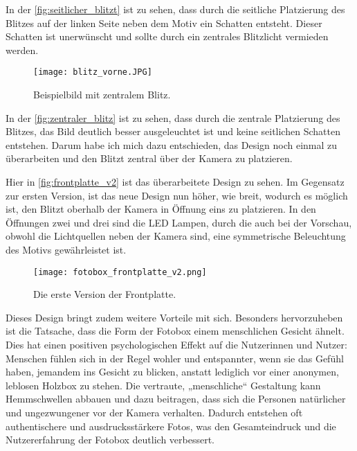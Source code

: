 In der \autoref{fig:seitlicher_blitzt} ist zu sehen, dass durch die seitliche Platzierung des Blitzes 
auf der linken Seite neben dem Motiv ein Schatten entsteht. Dieser Schatten ist unerwünscht und sollte
durch ein zentrales Blitzlicht vermieden werden.

\begin{figure}[H]
    \centering
    \texttt{[image: blitz\_vorne.JPG]}
    \caption{Beispielbild mit zentralem Blitz.}
    \label{fig:zentraler_blitz}
\end{figure}

In der \autoref{fig:zentraler_blitz} ist zu sehen, dass durch die zentrale Platzierung des Blitzes,
das Bild deutlich besser ausgeleuchtet ist und keine seitlichen Schatten entstehen.
Darum habe ich mich dazu entschieden, das Design noch einmal zu überarbeiten und
den Blitzt zentral über der Kamera zu platzieren.

\newpage

Hier in \autoref{fig:frontplatte_v2} ist das überarbeitete Design zu sehen.
Im Gegensatz zur ersten Version, ist das neue Design 
nun höher, wie breit, wodurch es möglich ist, den Blitzt oberhalb der Kamera in 
Öffnung eins zu platzieren. In den Öffnungen zwei und drei sind die LED Lampen,
durch die auch bei der Vorschau, obwohl die Lichtquellen neben der Kamera sind,
eine symmetrische Beleuchtung des Motivs gewährleistet ist.

\begin{figure}[H]
    \centering
    \texttt{[image: fotobox\_frontplatte\_v2.png]}
    \caption{Die erste Version der Frontplatte.}
    \label{fig:frontplatte_v2}
\end{figure}

Dieses Design bringt zudem weitere Vorteile mit sich. Besonders hervorzuheben
ist die Tatsache, dass die Form der Fotobox einem menschlichen Gesicht ähnelt.
Dies hat einen positiven psychologischen Effekt auf die Nutzerinnen und Nutzer:
Menschen fühlen sich in der Regel wohler und entspannter, wenn sie das Gefühl
haben, jemandem ins Gesicht zu blicken, anstatt lediglich vor einer anonymen,
leblosen Holzbox zu stehen. Die vertraute, „menschliche“ Gestaltung kann
Hemmschwellen abbauen und dazu beitragen, dass sich die Personen natürlicher und
ungezwungener vor der Kamera verhalten. Dadurch entstehen oft authentischere und
ausdrucksstärkere Fotos, was den Gesamteindruck und die Nutzererfahrung der Fotobox
deutlich verbessert.

\newpage

